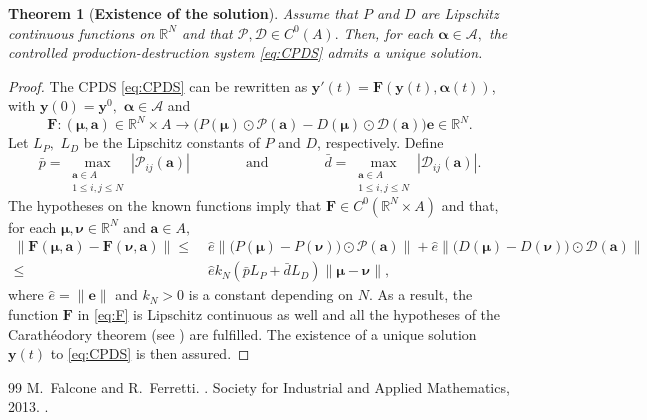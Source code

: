 \documentclass[10pt,a4paper]{amsart}
\newtheorem{thm}{Theorem}
\begin{document}
\begin{thm}[\textbf{Existence of the solution}]\label{thm:Existence of a solution}
    Assume that $P$ and $D$ are Lipschitz continuous functions on $\mathbb{R}^N$ and that $\mathcal{P},\mathcal{D}\in C^0(A).$  Then, for each $\bm{\alpha}\in\mathcal{A},$ the controlled production-destruction system \eqref{eq:CPDS} admits a unique solution. 
\end{thm}

\begin{proof}
    The CPDS \eqref{eq:CPDS} can be rewritten as $\bm{y}'(t)= \bm{F}(\bm{y}(t),\bm{\alpha}(t))$, with $\bm{y}(0)=\bm{y}^0,$  $\bm{\alpha}\in \mathcal{A}$ and
    \begin{equation}\label{eq:F}
        \bm{F} : (\bm{\mu},\bm{a})\in \mathbb{R}^N\times A \longrightarrow \big(P(\bm{\mu})\odot \mathcal{P}(\bm{a})-D(\bm{\mu})\odot \mathcal{D}(\bm{a}) \big) \bm{e}  \in \mathbb{R}^N.
    \end{equation}
    Let $L_P,$ $L_D$ be the Lipschitz constants of $P$ and $D$, respectively. Define 
    \begin{equation*}
        \bar{p}=\!\!\max_{\substack{\bm{a}\in A \\ 1\leq i,j\leq N}}|\mathcal{P}_{ij}(\bm{a})| \qquad \qquad \text{and} \qquad \qquad  \bar{d}=\!\!\max_{\substack{\bm{a}\in A \\ 1\leq i,j\leq N}}|\mathcal{D}_{ij}(\bm{a})|.
    \end{equation*}
    The hypotheses on the known functions imply that $\bm{F}\in C^0(\mathbb{R}^N\times A)$ and that, for each $\bm{\mu},\bm{\nu} \in \mathbb{R}^N$ and $\bm{a}\in A,$ 
    \begin{equation*}
        \begin{split}
            \|\bm{F}(\bm{\mu},\bm{a})-\bm{F}(\bm{\nu},\bm{a}) \| \leq \; & \hat{e}\|\big (P(\bm{\mu})-P(\bm{\nu}))\odot \mathcal{P}(\bm{a})  \|+\hat{e}\|\big (D(\bm{\mu})-D(\bm{\nu}))\odot \mathcal{D}(\bm{a}) \| \\
            \leq \; &\hat{e}k_N\left(\bar{p}L_P  +\bar{d}L_D\right)\|\bm{\mu}-\bm{\nu}\|,
        \end{split}
    \end{equation*}
    where $\hat{e}=\|\bm{e}\|$ and $k_N>0$ is a constant depending on $N.$ As a result, the function $\bm{F}$ in \eqref{eq:F} is Lipschitz continuous as well and all the hypotheses of the Carathéodory theorem (see \cite[Theorem 8.1]{FalconeFerretti}) are fulfilled. The existence of a unique solution $\bm{y}(t)$ to \eqref{eq:CPDS} is then assured.
\end{proof}

\begin{thebibliography}{99}
 M.~Falcone and R.~Ferretti. . \newblock Society for Industrial and Applied Mathematics, 2013. \newblock \href {https://doi.org/10.1137/1.9781611973051} {}.
\end{thebibliography}
\end{document}
